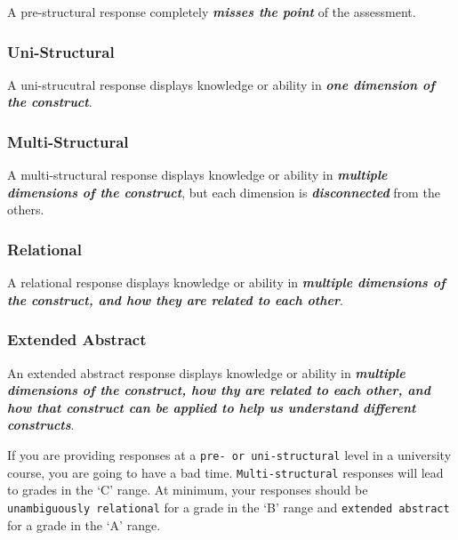 \documentclass[
]{book}
\begin{document}
A pre-structural response completely \textbf{\emph{misses the point}} of the assessment.

\hypertarget{uni-structural}{%
\subsubsection*{Uni-Structural}\label{uni-structural}}

A uni-strucutral response displays knowledge or ability in \textbf{\emph{one dimension of the construct}}.

\hypertarget{multi-structural}{%
\subsubsection*{Multi-Structural}\label{multi-structural}}

A multi-structural response displays knowledge or ability in \textbf{\emph{multiple dimensions of the construct}}, but each dimension is \textbf{\emph{disconnected}} from the others.

\hypertarget{relational}{%
\subsubsection*{Relational}\label{relational}}

A relational response displays knowledge or ability in \textbf{\emph{multiple dimensions of the construct, and how they are related to each other}}.

\hypertarget{extended-abstract}{%
\subsubsection*{Extended Abstract}\label{extended-abstract}}

An extended abstract response displays knowledge or ability in \textbf{\emph{multiple dimensions of the construct, how thy are related to each other, and how that construct can be applied to help us understand different constructs}}.

If you are providing responses at a \texttt{pre-\ or\ uni-structural} level in a university course, you are going to have a bad time. \texttt{Multi-structural} responses will lead to grades in the `C' range. At minimum, your responses should be \texttt{unambiguously\ relational} for a grade in the `B' range and \texttt{extended\ abstract} for a grade in the `A' range.
\end{document}
